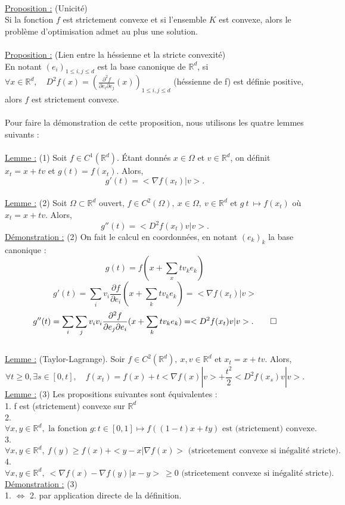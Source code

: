 \documentclass[12pt]{article}
\newcommand{\Rd}{\mathbb{R}^d}
\newcommand{\prop}{\underline{Proposition :} }
\newcommand{\demo}{\underline{Démonstration :} }
\newcommand{\lemme}{\underline{Lemme :} }
\begin{document}
\\
\prop (Unicité) \\
Si la fonction $f$ est strictement convexe et si l'ensemble $K$ est convexe, alors le problème d'optimisation admet au plus une solution.\\
\\
\prop (Lien entre la héssienne et la stricte convexité)\\ 
En notant $(e_i)_{1\leq i,j\leq d}$ est la base canonique de $\Rd$, si $\forall x \in \Rd, \quad D^2f(x) = (\frac{\partial^2f}{\partial e_i \partial e_j}(x))_{1\leq i,j\leq d}$ (héssienne de f) est définie positive, alors $f$ est strictement convexe.\\
\\
Pour faire la démonstration de cette proposition, nous utilisons les quatre lemmes suivants :\\
\\
\lemme  (1) Soit $f \in C^1(\Rd).$ Étant donnés $x \in \Omega$ et $v\in\Rd$, on définit $x_t = x + tv$ et $g(t) = f(x_t)$. Alors,
\[
g'(t) = <\nabla f(x_t)|v>.
\]
\\
\lemme  (2) Soit $\Omega \subset \Rd$ ouvert, $f \in C^2(\Omega),\: x \in \Omega, \: v \in \Rd$ et $g\:t\:\mapsto f(x_t)$ où $x_t = x + tv$. Alors,
\[
g''(t) = <D^2f(x_t)v|v>.
\]
\demo (2) On fait le calcul en coordonnées, en notant $(e_k)_k$ la base canonique :
\[
g(t) = f(x + \sum_xtv_ke_k)
\]
\[
g'(t) = \sum_i v_i\frac{\partial f}{\partial e_i}(x + \sum_ktv_ke_k) = <\nabla f(x_t)|v>
\]
\[
g''(t) = \sum_i\sum_jv_iv_i \frac{\partial^2f}{\partial e_j \partial e_i}(x + \sum_ktv_ke_k) = <D^2f(x_t)v|v>. \\
\qed
\]
\\
\lemme (Taylor-Lagrange). Soir $f \in C^2(\Rd),\: x, v \in \Rd$ et $x_t = x + tv$. Alors, 
\[
\forall t \geq 0, \exists s \in [0,t],\quad f(x_t) = f(x) + t <\nabla f(x) | v> + \frac{t^2}{2}<D^2f(x_s)v|v>.
\]
\lemme (3) Les propositions suivantes sont équivalentes :\\
1. f est (strictement) convexe sur $\Rd$\\
2.
\[
\forall x,y \in \Rd,\text{ la fonction } g : t\in[0,1] \mapsto f((1-t)x + ty) \text{ est (strictement) convexe.}
\]
3.
\[
\forall x,y \in \Rd, \: f(y) \geq f(x) + <y-x|\nabla f(x)> \text{ (stricetement convexe si inégalité stricte).}
\]
4. 
\[
\forall x,y \in \Rd, \: <\nabla f(x) - \nabla f(y)|x-y>\: \geq 0 \text{ (stricetement convexe si inégalité stricte).}
\]
\demo (3)\\
1. $\Longleftrightarrow$ 2. par application directe de la définition.\\
\end{document}
